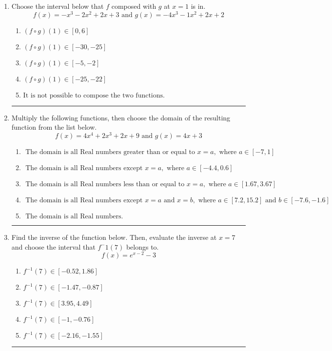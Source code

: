 \documentclass[14pt]{extbook}
\newcommand{\litem}[1]{\item#1\hspace*{-1cm}\rule{\textwidth}{0.4pt}}
\begin{document}
\begin{enumerate}
{\begin{enumerate}[label=\Alph*.]
\end{enumerate} }
\litem{
Choose the interval below that $f$ composed with $g$ at $x=1$ is in.\[ f(x) = -x^{3} -2 x^{2} +2 x + 3 \text{ and } g(x) = -4x^{3} -1 x^{2} +2 x + 2 \]\begin{enumerate}[label=\Alph*.]
\item \( (f \circ g)(1) \in [0, 6] \)
\item \( (f \circ g)(1) \in [-30, -25] \)
\item \( (f \circ g)(1) \in [-5, -2] \)
\item \( (f \circ g)(1) \in [-25, -22] \)
\item \( \text{It is not possible to compose the two functions.} \)

\end{enumerate} }
\litem{
Multiply the following functions, then choose the domain of the resulting function from the list below.\[ f(x) = 4x^{4} +2 x^{3} +2 x + 9 \text{ and } g(x) = 4x + 3 \]\begin{enumerate}[label=\Alph*.]
\item \( \text{ The domain is all Real numbers greater than or equal to } x = a, \text{ where } a \in [-7, 1] \)
\item \( \text{ The domain is all Real numbers except } x = a, \text{ where } a \in [-4.4, 0.6] \)
\item \( \text{ The domain is all Real numbers less than or equal to } x = a, \text{ where } a \in [1.67, 3.67] \)
\item \( \text{ The domain is all Real numbers except } x = a \text{ and } x = b, \text{ where } a \in [7.2, 15.2] \text{ and } b \in [-7.6, -1.6] \)
\item \( \text{ The domain is all Real numbers. } \)

\end{enumerate} }
\litem{
Find the inverse of the function below. Then, evaluate the inverse at $x = 7$ and choose the interval that $f^-1(7)$ belongs to.\[ f(x) = e^{x-2}-3 \]\begin{enumerate}[label=\Alph*.]
\item \( f^{-1}(7) \in [-0.52, 1.86] \)
\item \( f^{-1}(7) \in [-1.47, -0.87] \)
\item \( f^{-1}(7) \in [3.95, 4.49] \)
\item \( f^{-1}(7) \in [-1, -0.76] \)
\item \( f^{-1}(7) \in [-2.16, -1.55] \)


\end{enumerate}}
\end{enumerate}
\end{document}
